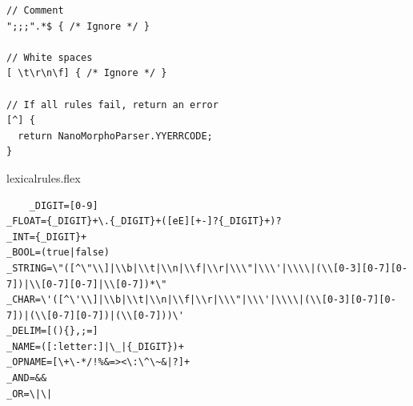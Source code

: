 \documentclass{homework}
\begin{document}
\begin{answer}
\begin{verbatim}
// Comment
";;;".*$ { /* Ignore */ }

// White spaces
[ \t\r\n\f] { /* Ignore */ }

// If all rules fail, return an error
[^] {
  return NanoMorphoParser.YYERRCODE;
}
  \end{verbatim}
\end{answer}

\newpage
\begin{question}{lexicalrules.flex}
\end{question}
\begin{answer}
  \begin{verbatim}
    _DIGIT=[0-9]
_FLOAT={_DIGIT}+\.{_DIGIT}+([eE][+-]?{_DIGIT}+)?
_INT={_DIGIT}+
_BOOL=(true|false)
_STRING=\"([^\"\\]|\\b|\\t|\\n|\\f|\\r|\\\"|\\\'|\\\\|(\\[0-3][0-7][0-7])|\\[0-7][0-7]|\\[0-7])*\"
_CHAR=\'([^\'\\]|\\b|\\t|\\n|\\f|\\r|\\\"|\\\'|\\\\|(\\[0-3][0-7][0-7])|(\\[0-7][0-7])|(\\[0-7]))\'
_DELIM=[(){},;=]
_NAME=([:letter:]|\_|{_DIGIT})+
_OPNAME=[\+\-*/!%&=><\:\^\~&|?]+
_AND=&&
_OR=\|\|
  \end{verbatim}
\end{answer}
\end{document}
